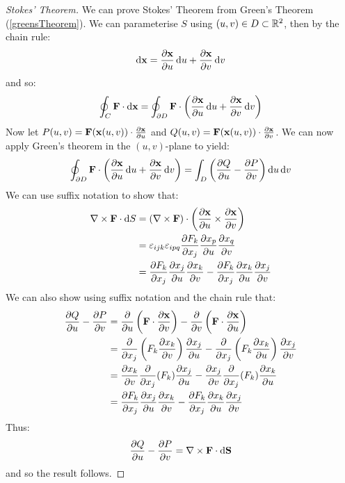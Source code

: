 \documentclass[../main.tex]{subfiles}
\begin{document}
\begin{proof}[Stokes' Theorem]
\nonexaminable
  We can prove Stokes' Theorem from Green's Theorem (\cref{greensTheorem}).
  We can parameterise $S$ using $(u, v) \in D \subset \mathbb{R}^2$, then by the chain rule:
  \[
    \d{\vec{x}} = \pderiv{\vec{x}}{u} \d{u} + \pderiv{\vec{x}}{v} \d{v}
  \]
  and so:
  \[
    \oint_{C} \vec{F} \cdot \d{\vec{x}} = \oint_{\partial D} \vec{F} \cdot \left(\pderiv{\vec{x}}{u} \d{u} + \pderiv{\vec{x}}{v} \d{v}\right)
  \]
  Now let $P(u, v) = \vec{F}(\vec{x}(u, v)) \cdot \pderiv{\vec{x}}{u}$ and $Q(u, v) = \vec{F}(\vec{x}(u, v)) \cdot \pderiv{\vec{x}}{v}$.
  We can now apply Green's theorem in the $(u, v)$-plane to yield:
  \[
    \oint_{\partial D} \vec{F} \cdot \left(\pderiv{\vec{x}}{u} \d{u} + \pderiv{\vec{x}}{v} \d{v}\right) = \int_{D} \left(\pderiv{Q}{u} - \pderiv{P}{v}\right) \d{u} \d{v}
  \]
  We can use suffix notation to show that:
  \begin{align*}
    \nabla \times \vec{F} \cdot \d{S} &= (\nabla \times \vec{F}) \cdot \left(\pderiv{\vec{x}}{u} \times \pderiv{\vec{x}}{v}\right) \\
                                      &= \levi_{i j k} \levi_{i p q} \pderiv{F_k}{x_j} \pderiv{x_p}{u} \pderiv{x_q}{v} \\
                                      &= \pderiv{F_k}{x_j} \pderiv{x_j}{u} \pderiv{x_k}{v} - \pderiv{F_k}{x_j} \pderiv{x_k}{u} \pderiv{x_j}{v}
  \end{align*}
  We can also show using suffix notation and the chain rule that:
  \begin{align*}
    \pderiv{Q}{u} - \pderiv{P}{v} &= \pderiv{}{u}\left(\vec{F} \cdot \pderiv{\vec{x}}{v}\right) - \pderiv{}{v}\left(\vec{F} \cdot \pderiv{\vec{x}}{u}\right) \\
                                  &= \pderiv{}{x_j}\left(F_k \pderiv{x_k}{v}\right) \pderiv{x_j}{u} - \pderiv{}{x_j}\left(F_k \pderiv{x_k}{u}\right)\pderiv{x_j}{v} \\
                                  &= \pderiv{x_k}{v}\pderiv{}{x_j}(F_k) \pderiv{x_j}{u} - \pderiv{x_j}{v}\pderiv{}{x_j}(F_k) \pderiv{x_k}{u} \\
                                  &= \pderiv{F_k}{x_j} \pderiv{x_j}{u} \pderiv{x_k}{v} - \pderiv{F_k}{x_j} \pderiv{x_k}{u} \pderiv{x_j}{v}
  \end{align*}
  Thus:
  \[
    \pderiv{Q}{u} - \pderiv{P}{v} = \nabla \times \vec{F} \cdot \d{\vec{S}}
  \]
  and so the result follows.
\end{proof}
\end{document}
